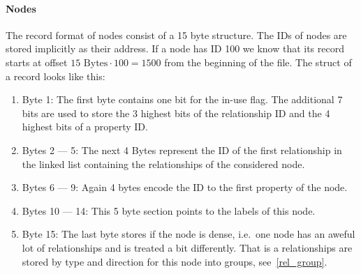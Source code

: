             \paragraph{Nodes}
                The record format of nodes consist of a 15 byte structure.
                The IDs of nodes are stored implicitly as their address.
                If a node has ID 100 we know that its record starts at offset $15 \text{ Bytes} \cdot 100 = 1500$ from the beginning of the file.
                The struct of a record looks like this:
                \begin{enumerate}
                    \item Byte 1: The first byte contains one bit for the in-use flag. 
                        The additional 7 bits are used to store the 3 highest bits of the relationship ID and the 4 highest bits of a property ID\@.
                    \item Bytes 2 --- 5: The next 4 Bytes represent the ID of the first relationship in the linked list containing the relationships of the considered node.
                    \item Bytes 6 --- 9: Again 4 bytes encode the ID to the first property of the node.
                    \item Bytes 10 --- 14: This 5 byte section points to the labels of this node.
                    \item Byte 15: The last byte stores if the node is dense, i.e.\ one node has an aweful lot of relationships and is treated a bit differently.
                        That is a relationships are stored by type and direction for this node into groups, see~\ref{rel_group}.
                \end{enumerate}
            
